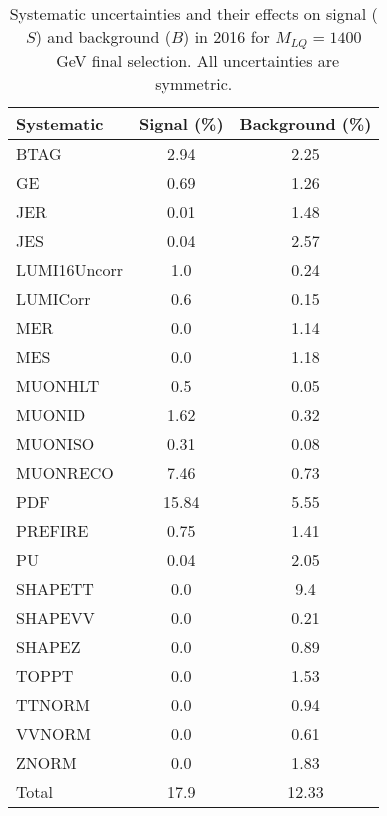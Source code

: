\begin{table}[htbp]
\begin{center}
\caption{Systematic uncertainties and their effects on signal ($S$) and background ($B$) in 2016 for $M_{LQ}=1400$~GeV final selection. All uncertainties are symmetric.}
\begin{tabular}{lcc}
\hline\hline
Systematic & Signal (\%) & Background (\%) \\ \hline 
BTAG & 2.94 & 2.25\\ 
GE & 0.69 & 1.26\\ 
JER & 0.01 & 1.48\\ 
JES & 0.04 & 2.57\\ 
LUMI16Uncorr & 1.0 & 0.24\\ 
LUMICorr & 0.6 & 0.15\\ 
MER & 0.0 & 1.14\\ 
MES & 0.0 & 1.18\\ 
MUONHLT & 0.5 & 0.05\\ 
MUONID & 1.62 & 0.32\\ 
MUONISO & 0.31 & 0.08\\ 
MUONRECO & 7.46 & 0.73\\ 
PDF & 15.84 & 5.55\\ 
PREFIRE & 0.75 & 1.41\\ 
PU & 0.04 & 2.05\\ 
SHAPETT & 0.0 & 9.4\\ 
SHAPEVV & 0.0 & 0.21\\ 
SHAPEZ & 0.0 & 0.89\\ 
TOPPT & 0.0 & 1.53\\ 
TTNORM & 0.0 & 0.94\\ 
VVNORM & 0.0 & 0.61\\ 
ZNORM & 0.0 & 1.83\\ 
Total & 17.9 & 12.33\\ \hline \hline
\end{tabular}
\label{tab:SysUncertainties_uujj_1400}
\end{center}
\end{table}

